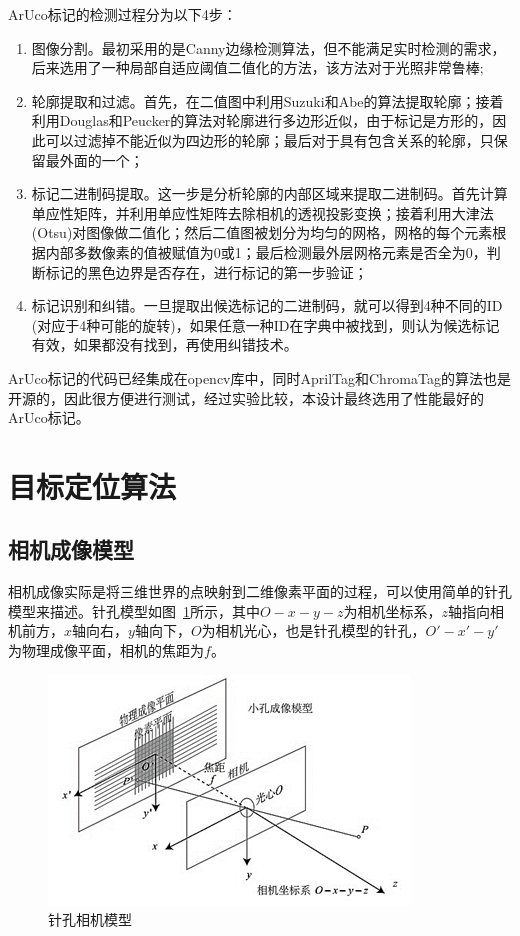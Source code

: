 ArUco标记的检测过程分为以下4步：

\begin{enumerate}[label=(\arabic*)] 
	\item 图像分割。最初采用的是Canny边缘检测算法，但不能满足实时检测的需求，后来选用了一种局部自适应阈值二值化的方法，该方法对于光照非常鲁棒;
	\item 轮廓提取和过滤。首先，在二值图中利用Suzuki和Abe的算法提取轮廓；接着利用Douglas和Peucker的算法对轮廓进行多边形近似，由于标记是方形的，因此可以过滤掉不能近似为四边形的轮廓；最后对于具有包含关系的轮廓，只保留最外面的一个；
	\item 标记二进制码提取。这一步是分析轮廓的内部区域来提取二进制码。首先计算单应性矩阵，并利用单应性矩阵去除相机的透视投影变换；接着利用大津法(Otsu)对图像做二值化；然后二值图被划分为均匀的网格，网格的每个元素根据内部多数像素的值被赋值为0或1；最后检测最外层网格元素是否全为0，判断标记的黑色边界是否存在，进行标记的第一步验证；
	\item 标记识别和纠错。一旦提取出候选标记的二进制码，就可以得到4种不同的ID (对应于4种可能的旋转)，如果任意一种ID在字典中被找到，则认为候选标记有效，如果都没有找到，再使用纠错技术。
\end{enumerate}

ArUco标记的代码已经集成在opencv库中，同时AprilTag和ChromaTag的算法也是开源的，因此很方便进行测试，经过实验比较，本设计最终选用了性能最好的ArUco标记。

\section{目标定位算法}
\subsection{相机成像模型}
相机成像实际是将三维世界的点映射到二维像素平面的过程，可以使用简单的针孔模型来描述。针孔模型如图~\ref{fig:2-16}所示，其中$O-x-y-z$为相机坐标系，$z$轴指向相机前方，$x$轴向右，$y$轴向下，$O$为相机光心，也是针孔模型的针孔，$O'-x'-y'$为物理成像平面，相机的焦距为$f$。

\begin{figure}[htb]
	\centering
	\includegraphics[width=0.6\linewidth]{figures/2-16.png}
	\caption{针孔相机模型}
	\label{fig:2-16}
\end{figure}

